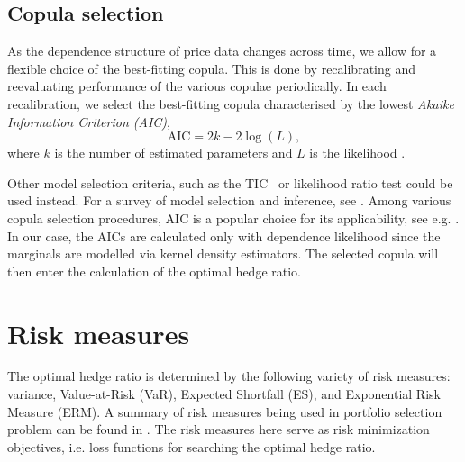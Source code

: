 \documentclass[11pt,a4paper,english]{article}
\begin{document}
\subsection{Copula selection}\label{subsec:copula-selection}
As the dependence structure of price data changes
across time, we allow for a flexible choice of the best-fitting
copula. This is done by recalibrating and reevaluating performance of the various copulae periodically. 
In each recalibration, we select the best-fitting
copula characterised by the lowest {\em Akaike Information Criterion
  (AIC)},
\begin{equation*}
 \text{AIC} = 2k- 2 \log(L),
\end{equation*}
where $k$ is the number of estimated
parameters and $L$ is the likelihood \citep{Akaike1973}. 

Other model selection criteria, such as the TIC~\citep{takeuchi1976distribution} or likelihood ratio test could be used instead.
For a survey of model selection and inference, see \cite{anderson1998comparison}.
Among various copula selection procedures, AIC is a popular choice for
its applicability, see e.g. \cite{breymann2003dependence}.
In our case, the AICs are calculated only with dependence likelihood
since the marginals are modelled via kernel density estimators.
The selected copula will then enter the calculation of the optimal
hedge ratio.

\section{Risk measures}\label{subsec:spectral-risk-measures}
The optimal hedge ratio is determined by the following variety of risk measures: variance, Value-at-Risk (VaR), Expected Shortfall (ES), and Exponential Risk Measure (ERM).
A summary of risk measures being used in portfolio selection problem
can be found in \citet{hardle2008applied}. 
The risk measures here serve as risk minimization objectives, i.e. loss functions for searching the optimal hedge ratio. 
\end{document}
